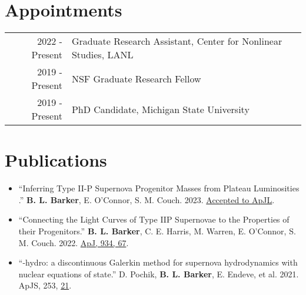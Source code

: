 \documentclass[letterpaper]{deedy-resume} %
\begin{document}
\begin{minipage}[t]{0.63\textwidth} %



\section{Appointments}
\begin{tabular}{rl}
  2022 - Present & Graduate Research Assistant, Center for Nonlinear Studies, LANL \\
  2019 - Present & NSF Graduate Research Fellow \\
  2019 - Present & PhD Candidate, Michigan State University \\
\end{tabular}

\section{Publications}
\begin{itemize}

        \item ``Inferring Type II-P Supernova Progenitor Masses from Plateau Luminosities .'' \textbf{B. L. Barker}, E. O'Connor, S. M. Couch. 2023. \href{https://doi.org/10.48550/arXiv.2211.05789}{Accepted to ApJL}.
        \item ``Connecting the Light Curves of Type IIP Supernovae to the Properties of their Progenitors.'' \textbf{B. L. Barker}, C. E. Harris, M. Warren, E. O'Connor, S. M. Couch. 2022. \href{https://doi.org/10.3847/1538-4357/ac77f3}{ApJ, 934, 67}.

  \item ``\thornado-hydro: a discontinuous Galerkin method for supernova hydrodynamics with nuclear equations of state.'' D. Pochik, \textbf{B. L. Barker}, E. Endeve, et al. 2021. ApJS, 253, \href{https://iopscience.iop.org/article/10.3847/1538-4365/abd700}{21}.


\end{itemize}
\end{minipage}
\end{document}

